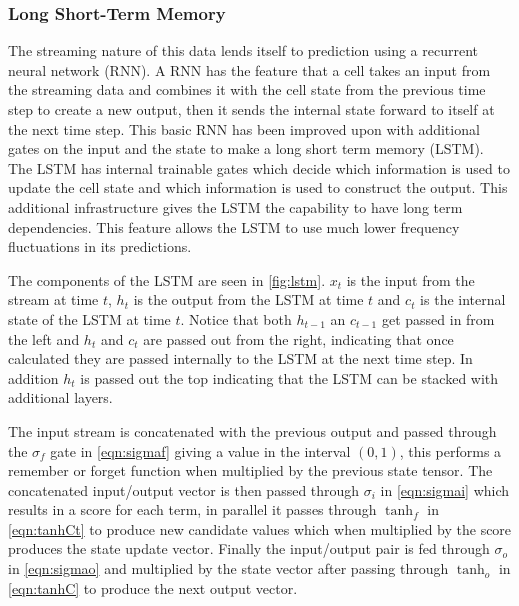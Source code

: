 \documentclass{article}
\begin{document}
\subsubsection{Long Short-Term Memory}
The streaming nature of this data lends itself to prediction using a recurrent neural network (RNN).  A RNN has the feature that a cell takes an input from the streaming data and combines it with the cell state from the previous time step to create a new output, then it sends the internal state forward to itself at the next time step.  This basic RNN has been improved upon with additional gates on the input and the state to make a long short term memory (LSTM).  The LSTM has internal trainable gates which decide which information is used to update the cell state and which information is used to construct the output.  This additional infrastructure gives the LSTM the capability to have long term dependencies.  This feature allows the LSTM to use much lower frequency fluctuations in its predictions.

The components of the LSTM are seen in  \cref{fig:lstm}. $x_t$ is the input from the stream at time $t$, $h_t$ is the output from the LSTM at time $t$ and $c_t$ is the internal state of the LSTM at time $t$.  Notice that both $h_{t-1}$ an $c_{t-1}$ get passed in from the left and $h_{t}$ and $c_t$ are passed out from the right, indicating that once calculated they are passed internally to the LSTM at the next time step.  In addition $h_t$ is passed out the top indicating that the LSTM can be stacked with additional layers.  

The input stream is concatenated with the previous output and passed through the $\sigma_f$ gate in \cref{eqn:sigmaf} giving a value in the interval $(0,1)$, this performs a remember or forget function when multiplied by the previous state tensor.  The concatenated input/output vector is then passed through $\sigma_i$ in \cref{eqn:sigmai} which results in a score for each term, in parallel it passes through $\tanh_f$ in \cref{eqn:tanhCt} to produce new candidate values which when multiplied by the score produces the state update vector.  Finally the input/output pair is fed through $\sigma_o$ in \cref{eqn:sigmao} and multiplied by the state vector after passing through $\tanh_o$ in \cref{eqn:tanhC} to produce the next output vector.
\end{document}
